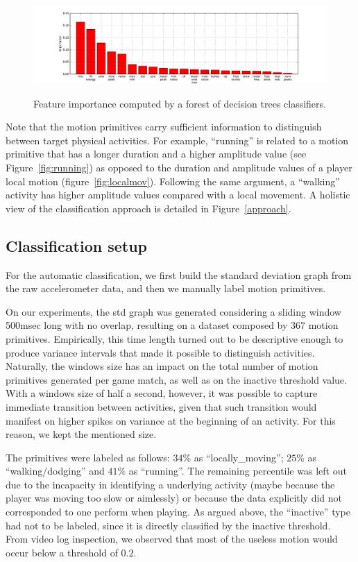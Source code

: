 \begin{figure}[h]
     \centering
     {\includegraphics[width=\textwidth]{images/04-activity/featureImportance}}
     \caption{Feature importance computed by a forest of decision trees classifiers.}
     \label{fig:feature_importance}
\end{figure}

Note that the motion primitives carry sufficient information to distinguish between target physical activities. For example, ``running'' is related to a motion primitive that has a longer duration and a higher amplitude value (see Figure~\ref{fig:running}) as opposed to the duration and amplitude values of a player local motion (figure~\ref{fig:localmov}). Following the same argument, a ``walking'' activity has higher amplitude values compared with a local movement. A holistic view of the classification approach is detailed in Figure~\ref{approach}. 

\subsection{Classification setup}

For the automatic classification, we first build the standard deviation graph from the raw accelerometer data, and then we manually label motion primitives. 

On our experiments, the std graph was generated considering a sliding window 500msec long with no overlap, resulting on a dataset composed by $367$ motion primitives. Empirically, this time length turned out to be descriptive enough to produce variance intervals that made it possible to distinguish activities. Naturally, the windows size has an impact on the total number of motion primitives generated per game match, as well as on the inactive threshold value. With a windows size of half a second, however, it was possible to capture immediate transition between activities, given that such transition would manifest on higher spikes on variance at the beginning of an activity. For this reason, we kept the mentioned size. 

The primitives were labeled as follows: $34\%$ as ``locally\_moving''; $25\%$ as ``walking/dodging'' and $41\%$ as ``running''. The remaining percentile was left out due to the incapacity in identifying a underlying activity (maybe because the player was moving too slow or aimlessly) or because the data explicitly did not corresponded to one perform when playing. As argued above, the ``inactive'' type had not to be labeled, since it is directly classified by the inactive threshold. From video log inspection, we observed that most of the useless motion would occur below a threshold of $0.2$.

